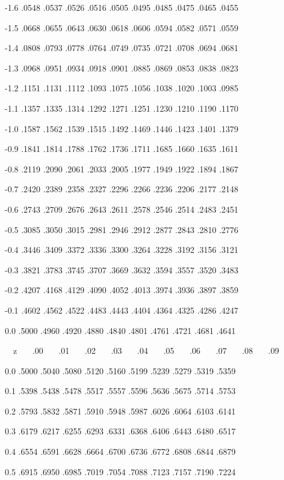 \documentclass[12pt,fleqn]{article}\usepackage{../common}
\begin{document}
-1.6 .0548 .0537 .0526 .0516 .0505 .0495 .0485 .0475 .0465 .0455

-1.5 .0668 .0655 .0643 .0630 .0618 .0606 .0594 .0582 .0571 .0559

-1.4 .0808 .0793 .0778 .0764 .0749 .0735 .0721 .0708 .0694 .0681

-1.3 .0968 .0951 .0934 .0918 .0901 .0885 .0869 .0853 .0838 .0823

-1.2 .1151 .1131 .1112 .1093 .1075 .1056 .1038 .1020 .1003 .0985

-1.1 .1357 .1335 .1314 .1292 .1271 .1251 .1230 .1210 .1190 .1170

-1.0 .1587 .1562 .1539 .1515 .1492 .1469 .1446 .1423 .1401 .1379

-0.9 .1841 .1814 .1788 .1762 .1736 .1711 .1685 .1660 .1635 .1611

-0.8 .2119 .2090 .2061 .2033 .2005 .1977 .1949 .1922 .1894 .1867

-0.7 .2420 .2389 .2358 .2327 .2296 .2266 .2236 .2206 .2177 .2148

-0.6 .2743 .2709 .2676 .2643 .2611 .2578 .2546 .2514 .2483 .2451

-0.5 .3085 .3050 .3015 .2981 .2946 .2912 .2877 .2843 .2810 .2776

-0.4 .3446 .3409 .3372 .3336 .3300 .3264 .3228 .3192 .3156 .3121

-0.3 .3821 .3783 .3745 .3707 .3669 .3632 .3594 .3557 .3520 .3483

-0.2 .4207 .4168 .4129 .4090 .4052 .4013 .3974 .3936 .3897 .3859

-0.1 .4602 .4562 .4522 .4483 .4443 .4404 .4364 .4325 .4286 .4247

0.0 .5000 .4960 .4920 .4880 .4840 .4801 .4761 .4721 .4681 .4641

\newpage

\ \ z \ \ \  .00  \ \ \ .01 \ \ \ .02 \ \ \ .03 \ \ \ .04 \ \ \ .05 \ \ \ .06 \
\ \ .07 \ \ \ .08 \ \ \ .09

0.0 .5000 .5040 .5080 .5120 .5160 .5199 .5239 .5279 .5319 .5359

0.1 .5398 .5438 .5478 .5517 .5557 .5596 .5636 .5675 .5714 .5753

0.2 .5793 .5832 .5871 .5910 .5948 .5987 .6026 .6064 .6103 .6141

0.3 .6179 .6217 .6255 .6293 .6331 .6368 .6406 .6443 .6480 .6517

0.4 .6554 .6591 .6628 .6664 .6700 .6736 .6772 .6808 .6844 .6879

0.5 .6915 .6950 .6985 .7019 .7054 .7088 .7123 .7157 .7190 .7224
\end{document}
